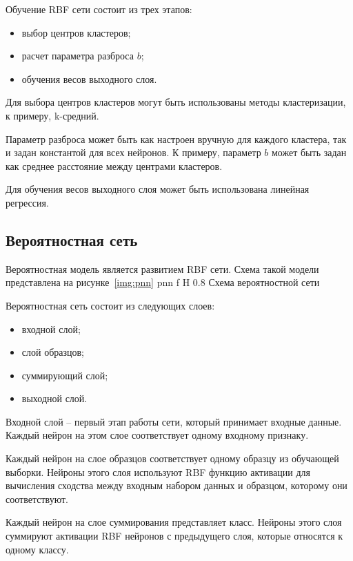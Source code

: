 Обучение RBF сети состоит из трех этапов:
\begin{itemize}
	\item выбор центров кластеров;
	\item расчет параметра разброса $b$;
	\item обучения весов выходного слоя.
\end{itemize}

Для выбора центров кластеров могут быть использованы методы кластеризации, к примеру, k-средний.

Параметр разброса может быть как настроен вручную для каждого кластера, так и задан константой для всех нейронов.
К примеру, параметр $b$ может быть задан как среднее расстояние между центрами кластеров.

Для обучения весов выходного слоя может быть использована линейная регрессия.

\subsection{Вероятностная сеть}
Вероятностная модель является развитием RBF сети. Схема такой модели представлена на рисунке~\ref{img:pnn}
{pnn} %
{f} %
{H} %
{0.8\textwidth} %
{Схема вероятностной сети} %

Вероятностная сеть состоит из следующих слоев:
\begin{itemize}
	\item входной слой;
	\item слой образцов;
	\item суммирующий слой;
	\item выходной слой.
\end{itemize}

Входной слой -- первый этап работы сети, который принимает входные данные.
Каждый нейрон на этом слое соответствует одному входному признаку.

Каждый нейрон на слое образцов соответствует одному образцу из обучающей выборки.
Нейроны этого слоя используют RBF функцию активации для вычисления сходства между входным набором данных и образцом, которому они соответствуют.

Каждый нейрон на слое суммирования представляет класс.
Нейроны этого слоя суммируют активации RBF нейронов с предыдущего слоя, которые относятся к одному классу.

